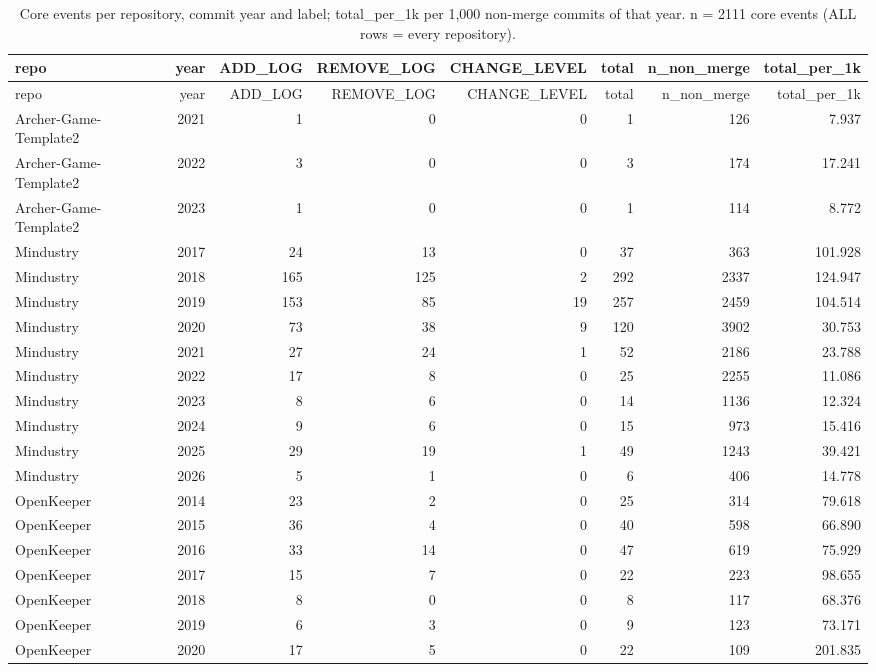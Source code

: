 {\small
\begin{longtable}{lrrrrrrr}
\caption{Core events per repository, commit year and label; total\_per\_1k per 1,000 non-merge commits of that year. n = 2111 core events (ALL rows = every repository).}\label{tab:rq1_events_per_year}\\
\toprule
repo & year & ADD\_LOG & REMOVE\_LOG & CHANGE\_LEVEL & total & n\_non\_merge & total\_per\_1k \\
\midrule
\endfirsthead
\toprule
repo & year & ADD\_LOG & REMOVE\_LOG & CHANGE\_LEVEL & total & n\_non\_merge & total\_per\_1k \\
\midrule
\endhead
\bottomrule
\endfoot
Archer-Game-Template2 & 2021 & 1 & 0 & 0 & 1 & 126 & 7.937 \\
Archer-Game-Template2 & 2022 & 3 & 0 & 0 & 3 & 174 & 17.241 \\
Archer-Game-Template2 & 2023 & 1 & 0 & 0 & 1 & 114 & 8.772 \\
Mindustry & 2017 & 24 & 13 & 0 & 37 & 363 & 101.928 \\
Mindustry & 2018 & 165 & 125 & 2 & 292 & 2337 & 124.947 \\
Mindustry & 2019 & 153 & 85 & 19 & 257 & 2459 & 104.514 \\
Mindustry & 2020 & 73 & 38 & 9 & 120 & 3902 & 30.753 \\
Mindustry & 2021 & 27 & 24 & 1 & 52 & 2186 & 23.788 \\
Mindustry & 2022 & 17 & 8 & 0 & 25 & 2255 & 11.086 \\
Mindustry & 2023 & 8 & 6 & 0 & 14 & 1136 & 12.324 \\
Mindustry & 2024 & 9 & 6 & 0 & 15 & 973 & 15.416 \\
Mindustry & 2025 & 29 & 19 & 1 & 49 & 1243 & 39.421 \\
Mindustry & 2026 & 5 & 1 & 0 & 6 & 406 & 14.778 \\
OpenKeeper & 2014 & 23 & 2 & 0 & 25 & 314 & 79.618 \\
OpenKeeper & 2015 & 36 & 4 & 0 & 40 & 598 & 66.890 \\
OpenKeeper & 2016 & 33 & 14 & 0 & 47 & 619 & 75.929 \\
OpenKeeper & 2017 & 15 & 7 & 0 & 22 & 223 & 98.655 \\
OpenKeeper & 2018 & 8 & 0 & 0 & 8 & 117 & 68.376 \\
OpenKeeper & 2019 & 6 & 3 & 0 & 9 & 123 & 73.171 \\
OpenKeeper & 2020 & 17 & 5 & 0 & 22 & 109 & 201.835 \\

\end{longtable}}
